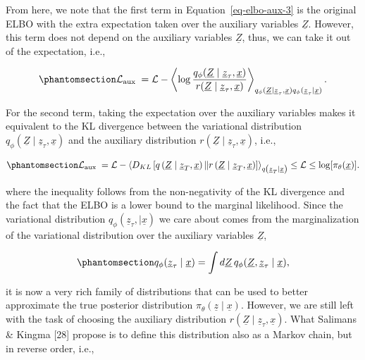 \documentclass[
]{scrartcl}
\begin{document}
\begin{refsection}
From here, we note that the first term in Equation~\ref{eq-elbo-aux-3}
is the original ELBO with the extra expectation taken over the auxiliary
variables \(\underline{Z}\). However, this term does not depend on the
auxiliary variables \(\underline{Z}\), thus, we can take it out of the
expectation, i.e.,

\begin{equation}\phantomsection\label{eq-elbo-aux-4}{
\mathcal{L}_{\text {aux }} = \mathcal{L} - 
\left\langle 
    \log \frac{q_\phi(\underline{Z} \mid \underline{z}_\tau, \underline{x})}{r(\underline{Z} \mid \underline{z}_\tau, \underline{x})}
\right\rangle_{
    q_\phi(\underline{Z} \mid \underline{z}_\tau, \underline{x})
    q_\phi(\underline{z}_\tau \mid \underline{x})
}.
}\end{equation}

For the second term, taking the expectation over the auxiliary variables
makes it equivalent to the KL divergence between the variational
distribution
\(q_\phi(\underline{Z} \mid \underline{z}_\tau, \underline{x})\) and the
auxiliary distribution
\(r(\underline{Z} \mid \underline{z}_\tau, \underline{x})\), i.e.,

\begin{equation}\phantomsection\label{eq-elbo-aux-5}{
\mathcal{L}_{\text {aux }} = \mathcal{L} - 
\left\langle 
    D_{K L}\left[
        q\left(\underline{Z} \mid \underline{z}_T, \underline{x}\right) \| 
        r\left(\underline{Z} \mid \underline{z}_T, \underline{x}\right)
    \right]
\right\rangle_{q\left(\underline{z}_T \mid \underline{x}\right)}
\leq \mathcal{L} \leq \log [\pi_\theta(\underline{x})].
}\end{equation}

where the inequality follows from the non-negativity of the KL
divergence and the fact that the ELBO is a lower bound to the marginal
likelihood. Since the variational distribution
\(q_\phi(\underline{z}_\tau,\mid \underline{x})\) we care about comes
from the marginalization of the variational distribution over the
auxiliary variables \(\underline{Z}\),

\begin{equation}\phantomsection\label{eq-mcmc-marginalization}{
q_\phi(\underline{z}_\tau \mid \underline{x}) = 
\int d\underline{Z} \, 
q_\phi(\underline{Z}, \underline{z}_\tau \mid \underline{x}),
}\end{equation}

it is now a very rich family of distributions that can be used to better
approximate the true posterior distribution
\(π_\theta(\underline{z} \mid
\underline{x})\). However, we are still left with the task of choosing
the auxiliary distribution \(r(\underline{Z} \mid \underline{z}_\tau,
\underline{x})\). What Salimans \& Kingma {[}28{]} propose is to define
this distribution also as a Markov chain, but in reverse order, i.e.,


\end{refsection}
\end{document}
